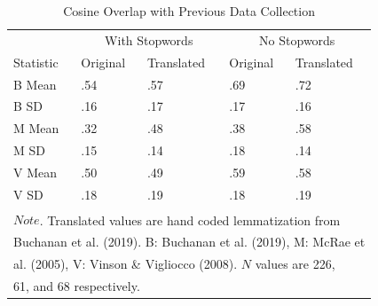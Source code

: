 \documentclass[man]{apa6}
\begin{document}
\begin{table}[t]

\caption{\label{tab:tab7}Cosine Overlap with Previous Data Collection}
\centering
\begin{tabular}{lllll}
\toprule
\multicolumn{1}{c}{ } & \multicolumn{2}{c}{With Stopwords} & \multicolumn{2}{c}{No Stopwords} \\
\cmidrule(l{3pt}r{3pt}){2-3} \cmidrule(l{3pt}r{3pt}){4-5}
Statistic & Original & Translated & Original & Translated\\
\midrule
B Mean & .54 & .57 & .69 & .72\\
B SD & .16 & .17 & .17 & .16\\
M Mean & .32 & .48 & .38 & .58\\
M SD & .15 & .14 & .18 & .14\\
V Mean & .50 & .49 & .59 & .58\\
\addlinespace
V SD & .18 & .19 & .18 & .19\\
\bottomrule
\multicolumn{5}{l}{\textsuperscript{} $Note$. Translated values are hand coded lemmatization from}\\
\multicolumn{5}{l}{Buchanan et al. (2019). B: Buchanan et al. (2019), M: McRae et}\\
\multicolumn{5}{l}{al. (2005), V: Vinson \& Vigliocco (2008). $N$ values are 226,}\\
\multicolumn{5}{l}{61, and 68 respectively.}\\
\end{tabular}
\end{table}
\end{document}

